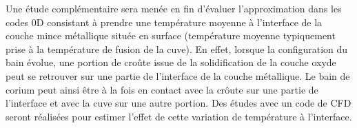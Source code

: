 Une étude complémentaire sera menée en fin d'évaluer l'approximation dans les codes 0D consistant à prendre une température moyenne à l'interface de la couche mince métallique située en surface (température moyenne typiquement prise à la température de fusion de la cuve). En effet, lorsque la configuration du bain évolue, une portion de croûte issue de la solidification de la couche oxyde peut se retrouver sur une partie de l'interface de la couche métallique. Le bain de corium peut ainsi être à la fois en contact avec la crôute  sur une partie de l'interface et avec la cuve sur une autre portion. Des études avec un code de CFD seront réalisées pour estimer l'effet de cette variation de température à l'interface.